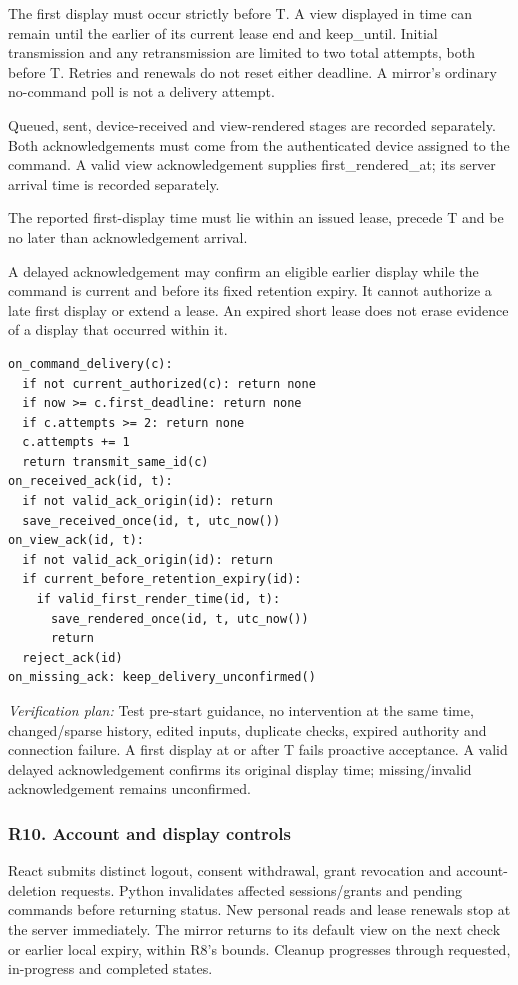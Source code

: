 \documentclass[conference,letterpaper]{IEEEtran}
\begin{document}
The first display must occur strictly before T. A view displayed in time can remain until the earlier of its current lease end and keep\_until. Initial transmission and any retransmission are limited to two total attempts, both before T. Retries and renewals do not reset either deadline. A mirror's ordinary no-command poll is not a delivery attempt.

Queued, sent, device-received and view-rendered stages are recorded separately. Both acknowledgements must come from the authenticated device assigned to the command. A valid view acknowledgement supplies first\_rendered\_at; its server arrival time is recorded separately.

The reported first-display time must lie within an issued lease, precede T and be no later than acknowledgement arrival.

A delayed acknowledgement may confirm an eligible earlier display while the command is current and before its fixed retention expiry. It cannot authorize a late first display or extend a lease. An expired short lease does not erase evidence of a display that occurred within it.

\begin{lstlisting}
on_command_delivery(c):
  if not current_authorized(c): return none
  if now >= c.first_deadline: return none
  if c.attempts >= 2: return none
  c.attempts += 1
  return transmit_same_id(c)
on_received_ack(id, t):
  if not valid_ack_origin(id): return
  save_received_once(id, t, utc_now())
on_view_ack(id, t):
  if not valid_ack_origin(id): return
  if current_before_retention_expiry(id):
    if valid_first_render_time(id, t):
      save_rendered_once(id, t, utc_now())
      return
  reject_ack(id)
on_missing_ack: keep_delivery_unconfirmed()
\end{lstlisting}



\textit{Verification plan:} Test pre-start guidance, no intervention at the same time, changed/sparse history, edited inputs, duplicate checks, expired authority and connection failure. A first display at or after T fails proactive acceptance. A valid delayed acknowledgement confirms its original display time; missing/invalid acknowledgement remains unconfirmed.

\subsubsection*{R10. Account and display controls}

React submits distinct logout, consent withdrawal, grant revocation and account-deletion requests. Python invalidates affected sessions/grants and pending commands before returning status. New personal reads and lease renewals stop at the server immediately. The mirror returns to its default view on the next check or earlier local expiry, within R8's bounds. Cleanup progresses through requested, in-progress and completed states.
\end{document}
